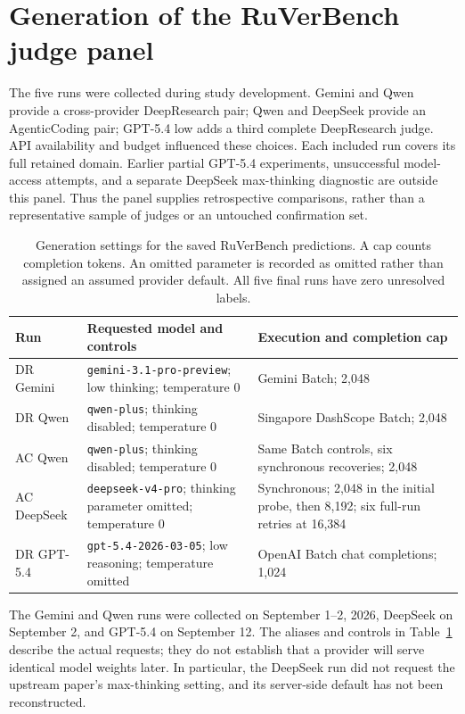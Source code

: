\clearpage
\section{Generation of the RuVerBench judge panel}
\label{app:generation}

The five runs were collected during study development. Gemini and Qwen provide
a cross-provider DeepResearch pair; Qwen and DeepSeek provide an AgenticCoding
pair; GPT-5.4 low adds a third complete DeepResearch judge. API availability and
budget influenced these choices. Each included run covers its full retained
domain. Earlier partial GPT-5.4 experiments, unsuccessful model-access attempts,
and a separate DeepSeek max-thinking diagnostic are outside this panel. Thus the
panel supplies retrospective comparisons, rather than a representative sample
of judges or an untouched confirmation set.

\begin{table}[htbp]
\centering\small
\caption{Generation settings for the saved RuVerBench predictions. A cap counts
completion tokens. An omitted parameter is recorded as omitted rather than
assigned an assumed provider default. All five final runs have zero unresolved
labels.}
\label{tab:generation}
\begin{tabularx}{\linewidth}{lXX}
\toprule
Run & Requested model and controls & Execution and completion cap\\
\midrule
DR Gemini & \texttt{gemini-3.1-pro-preview}; low thinking; temperature 0 & Gemini Batch; 2,048\\
DR Qwen & \texttt{qwen-plus}; thinking disabled; temperature 0 & Singapore DashScope Batch; 2,048\\
AC Qwen & \texttt{qwen-plus}; thinking disabled; temperature 0 & Same Batch controls, six synchronous recoveries; 2,048\\
AC DeepSeek & \texttt{deepseek-v4-pro}; thinking parameter omitted; temperature 0 & Synchronous; 2,048 in the initial probe, then 8,192; six full-run retries at 16,384\\
DR GPT-5.4 & \texttt{gpt-5.4-2026-03-05}; low reasoning; temperature omitted & OpenAI Batch chat completions; 1,024\\
\bottomrule
\end{tabularx}
\end{table}

The Gemini and Qwen runs were collected on September 1--2, 2026, DeepSeek on
September 2, and GPT-5.4 on September 12. The aliases and controls in
Table~\ref{tab:generation} describe the actual requests; they do not establish
that a provider will serve identical model weights later. In particular, the
DeepSeek run did not request the upstream paper's max-thinking setting, and
its server-side default has not been reconstructed.

